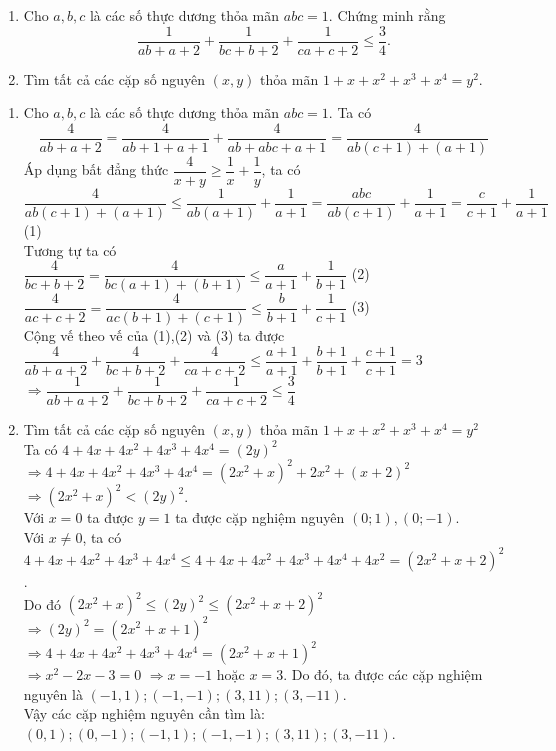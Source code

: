 \begin{ex}%
    \hfill
    \begin{enumerate}
    \item Cho $a,b,c$ là các số thực dương thỏa mãn $abc=1$. Chứng minh rằng
    $$ \dfrac{1}{ab+a+2}+\dfrac{1}{bc+b+2}+\dfrac{1}{ca+c+2} \leq \dfrac{3}{4}.$$
    \item Tìm tất cả các cặp số nguyên $(x,y)$ thỏa mãn $1+x+x^2+x^3+x^4=y^2$.
    \end{enumerate}
    
\loigiai
    {
    \begin{enumerate}
    \item Cho $a,b,c$ là các số thực dương thỏa mãn $abc=1$. Ta có\\
    $$ \dfrac{4}{ab+a+2}=\dfrac{4}{ab+1+a+1}+\dfrac{4}{ab+abc+a+1} =\dfrac{4}{ab(c+1)+(a+1)}$$
    Áp dụng bất đẳng thức $\dfrac{4}{x+y} \geq \dfrac{1}{x}+\dfrac{1}{y}$, ta có\\
    $\dfrac{4}{ab(c+1)+(a+1)} \leq \dfrac{1}{ab(a+1)}+\dfrac{1}{a+1}=\dfrac{abc}{ab(c+1)}+\dfrac{1}{a+1}=\dfrac{c}{c+1}+\dfrac{1}{a+1}$ (1)\\
    
    Tương tự ta có \\
    $\dfrac{4}{bc+b+2}=\dfrac{4}{bc(a+1)+(b+1)} \leq \dfrac{a}{a+1}+\dfrac{1}{b+1}$ (2)\\
    $\dfrac{4}{ac+c+2}=\dfrac{4}{ac(b+1)+(c+1)} \leq \dfrac{b}{b+1}+\dfrac{1}{c+1}$ (3)\\
    
    Cộng vế theo vế của (1),(2) và (3) ta được\\
    $ \dfrac{4}{ab+a+2}+\dfrac{4}{bc+b+2}+\dfrac{4}{ca+c+2} \leq \dfrac{a+1}{a+1}+\dfrac{b+1}{b+1}+\dfrac{c+1}{c+1}=3$\\
   $\Rightarrow \dfrac{1}{ab+a+2}+\dfrac{1}{bc+b+2}+\dfrac{1}{ca+c+2} \leq \dfrac{3}{4}$
    
    
    \item Tìm tất cả các cặp số nguyên $(x,y)$ thỏa mãn $1+x+x^2+x^3+x^4=y^2$\\
    Ta có $4+4x+4x^2+4x^3+4x^4=(2y)^2$
     $\Rightarrow 4+4x+4x^2+4x^3+4x^4=(2x^2+x)^2+2x^2+(x+2)^2$ \\
     $\Rightarrow (2x^2+x)^2<(2y)^2$.\\
    Với $x=0$ ta được $y=1$ ta được cặp nghiệm nguyên $(0;1), (0;-1)$.\\
    Với $x \ne 0$, ta có $4+4x+4x^2+4x^3+4x^4 \leq 4+4x+4x^2+4x^3+4x^4 +4x^2=(2x^2+x+2)^2$.\\
   Do đó $(2x^2+x)^2 \leq (2y)^2 \leq (2x^2+x+2)^2$\\
   $\Rightarrow (2y)^2=(2x^2+x+1)^2$\\
   $\Rightarrow 4+4x+4x^2+4x^3+4x^4=(2x^2+x+1)^2$ \\
   $\Rightarrow x^2-2x-3=0$ $\Rightarrow x=-1$ hoặc $x=3$.
   Do đó, ta được các cặp nghiệm nguyên là $(-1,1); (-1,-1); (3,11); (3,-11)$.\\
   Vậy các cặp nghiệm nguyên cần tìm là: $(0,1); (0,-1); (-1,1); (-1,-1); (3,11); (3,-11)$.\\
    \end{enumerate}   
    }
\end{ex}

